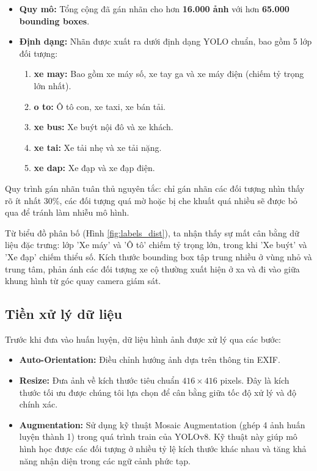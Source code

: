 \begin{itemize}
    \item \textbf{Quy mô:} Tổng cộng đã gán nhãn cho hơn \textbf{16.000 ảnh} với hơn \textbf{65.000 bounding boxes}.
    
    \item \textbf{Định dạng:} Nhãn được xuất ra dưới định dạng YOLO chuẩn, bao gồm 5 lớp đối tượng:
    \begin{enumerate}
        \item \textbf{xe may:} Bao gồm xe máy số, xe tay ga và xe máy điện (chiếm tỷ trọng lớn nhất).
        \item \textbf{o to:} Ô tô con, xe taxi, xe bán tải.
        \item \textbf{xe bus:} Xe buýt nội đô và xe khách.
        \item \textbf{xe tai:} Xe tải nhẹ và xe tải nặng.
        \item \textbf{xe dap:} Xe đạp và xe đạp điện.
    \end{enumerate}
\end{itemize}

Quy trình gán nhãn tuân thủ nguyên tắc: chỉ gán nhãn các đối tượng nhìn thấy rõ ít nhất 30\%, các đối tượng quá mờ hoặc bị che khuất quá nhiều sẽ được bỏ qua để tránh làm nhiễu mô hình.

Từ biểu đồ phân bố (Hình \ref{fig:labels_dist}), ta nhận thấy sự mất cân bằng dữ liệu đặc trưng: lớp 'Xe máy' và 'Ô tô' chiếm tỷ trọng lớn, trong khi 'Xe buýt' và 'Xe đạp' chiếm thiểu số. Kích thước bounding box tập trung nhiều ở vùng nhỏ và trung tâm, phản ánh các đối tượng xe cộ thường xuất hiện ở xa và đi vào giữa khung hình từ góc quay camera giám sát.

\subsection{Tiền xử lý dữ liệu}
Trước khi đưa vào huấn luyện, dữ liệu hình ảnh được xử lý qua các bước:

\begin{itemize}
    \item \textbf{Auto-Orientation:} Điều chỉnh hướng ảnh dựa trên thông tin EXIF.
    \item \textbf{Resize:} Đưa ảnh về kích thước tiêu chuẩn $416 \times 416$ pixels. Đây là kích thước tối ưu được chúng tôi lựa chọn để cân bằng giữa tốc độ xử lý và độ chính xác.
    \item \textbf{Augmentation:} Sử dụng kỹ thuật Mosaic Augmentation (ghép 4 ảnh huấn luyện thành 1) trong quá trình train của YOLOv8. Kỹ thuật này giúp mô hình học được các đối tượng ở nhiều tỷ lệ kích thước khác nhau và tăng khả năng nhận diện trong các ngữ cảnh phức tạp.
\end{itemize}

